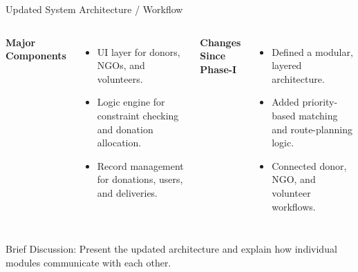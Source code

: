 \documentclass[aspectratio=169,11pt]{beamer}
\newcommand{\smallnote}[1]{%
\vspace{0.08cm}
{\scriptsize\color{GEUGrey}#1}
}
\begin{document}
\begin{frame}{Updated System Architecture / Workflow}

\begin{center}


\end{center}

\vspace{4mm}

\begin{columns}[T,totalwidth=\textwidth]


\textbf{\color{GEUBlue}Major Components}

\begin{itemize}\itemsep2pt
\item UI layer for donors, NGOs, and volunteers.
\item Logic engine for constraint checking and donation allocation.
\item Record management for donations, users, and deliveries.
\end{itemize}


\textbf{\color{GEUBlue}Changes Since Phase-I}

\begin{itemize}\itemsep2pt
\item Defined a modular, layered architecture.
\item Added priority-based matching and route-planning logic.
\item Connected donor, NGO, and volunteer workflows.
\end{itemize}

\end{columns}

\vfill

\smallnote{
Brief Discussion: Present the updated architecture and explain
how individual modules communicate with each other.
}

\end{frame}
\end{document}
